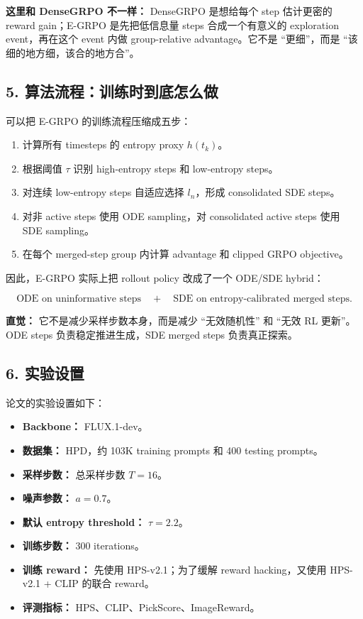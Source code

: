 \begin{warnbox}
\textbf{这里和 DenseGRPO 不一样：} DenseGRPO 是想给每个 step 估计更密的 reward gain；E-GRPO 是先把低信息量 steps 合成一个有意义的 exploration event，再在这个 event 内做 group-relative advantage。它不是 ``更细''，而是 ``该细的地方细，该合的地方合''。
\end{warnbox}

\subsection{5. 算法流程：训练时到底怎么做}

可以把 E-GRPO 的训练流程压缩成五步：

\begin{enumerate}[leftmargin=1.5em]
  \item 计算所有 timesteps 的 entropy proxy \(h(t_k)\)。
  \item 根据阈值 \(\tau\) 识别 high-entropy steps 和 low-entropy steps。
  \item 对连续 low-entropy steps 自适应选择 \(l_n\)，形成 consolidated SDE steps。
  \item 对非 active steps 使用 ODE sampling，对 consolidated active steps 使用 SDE sampling。
  \item 在每个 merged-step group 内计算 advantage 和 clipped GRPO objective。
\end{enumerate}

因此，E-GRPO 实际上把 rollout policy 改成了一个 ODE/SDE hybrid：

\[
\text{ODE on uninformative steps}
\quad + \quad
\text{SDE on entropy-calibrated merged steps}.
\]

\begin{intubox}
\textbf{直觉：} 它不是减少采样步数本身，而是减少 ``无效随机性'' 和 ``无效 RL 更新''。ODE steps 负责稳定推进生成，SDE merged steps 负责真正探索。
\end{intubox}

\subsection{6. 实验设置}

论文的实验设置如下：

\begin{itemize}[leftmargin=1.5em]
  \item \textbf{Backbone：} FLUX.1-dev。
  \item \textbf{数据集：} HPD，约 103K training prompts 和 400 testing prompts。
  \item \textbf{采样步数：} 总采样步数 \(T=16\)。
  \item \textbf{噪声参数：} \(a=0.7\)。
  \item \textbf{默认 entropy threshold：} \(\tau=2.2\)。
  \item \textbf{训练步数：} 300 iterations。
  \item \textbf{训练 reward：} 先使用 HPS-v2.1；为了缓解 reward hacking，又使用 HPS-v2.1 + CLIP 的联合 reward。
  \item \textbf{评测指标：} HPS、CLIP、PickScore、ImageReward。
\end{itemize}

